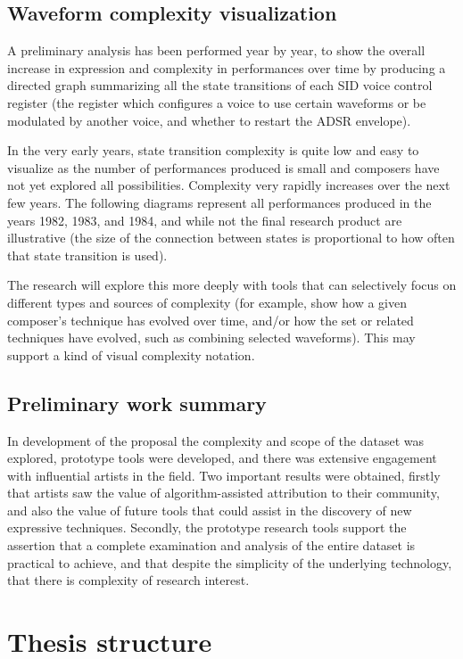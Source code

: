 \documentclass[10pt]{article}
\begin{document}
\begin{multicols*}{2}
\subsection{Waveform complexity visualization}

A preliminary analysis has been performed year by year, to show the overall increase in expression and complexity in performances over time by producing a directed graph summarizing all the state transitions of each SID voice control register (the register which configures a voice to use certain waveforms or be modulated by another voice, and whether to restart the ADSR envelope).

In the very early years, state transition complexity is quite low and easy to visualize as the number of performances produced is small and composers have not yet explored all possibilities. Complexity very rapidly increases over the next few years. The following diagrams represent all performances produced in the years 1982, 1983, and 1984, and while not the final research product are illustrative (the size of the connection between states is proportional to how often that state transition is used).

The research will explore this more deeply with tools that can selectively focus on different types and sources of complexity (for example, show how a given composer’s technique has evolved over time, and/or how the set or related techniques have evolved, such as combining selected waveforms). This may support a kind of visual complexity notation.

\subsection{Preliminary work summary}

In development of the proposal the complexity and scope of the dataset was explored, prototype tools were developed, and there was extensive engagement with influential artists in the field. Two important results were obtained, firstly that artists saw the value of algorithm-assisted attribution to their community, and also the value of future tools that could assist in the discovery of new expressive techniques. Secondly, the prototype research tools support the assertion that a complete examination and analysis of the entire dataset is practical to achieve, and that despite the simplicity of the underlying technology, that there is complexity of research interest.

\section{Thesis structure}


\end{multicols*}
\end{document}
